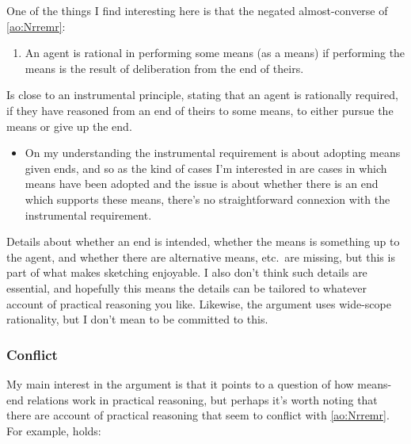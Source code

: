\documentclass[10pt]{article}
\newcommand{\hozlinedash}[0]{%
  \noindent\hdashrule[0.5ex][c]{\textwidth}{.1pt}{2.5pt}
}
\begin{document}
One of the things I find interesting here is that the negated almost-converse of \ref{ao:Nrremr}:
\begin{enumerate}[label=\(\overline{\arabic*}\)., ref=\(\overline{(\arabic*)}\)]
\item\label{ao:Nrremr} An agent is rational in performing some means (as a means) if performing the means is the result of deliberation from the end of theirs.
\end{enumerate}
Is close to an instrumental principle, stating that an agent is rationally required, if they have reasoned from an end of theirs to some means, to either pursue the means or give up the end.

\begin{itemize}
\item[] On my understanding the instrumental requirement is about adopting means given ends, and so as the kind of cases I'm interested in are cases in which means have been adopted and the issue is about whether there is an end which supports these means, there's no straightforward connexion with the instrumental requirement.
\end{itemize}


Details about whether an end is intended, whether the means is something up to the agent, and whether there are alternative means, etc.\ are missing, but this is part of what makes sketching enjoyable.
I also don't think such details are essential, and hopefully this means the details can be tailored to whatever account of practical reasoning you like.
Likewise, the argument uses wide-scope rationality, but I don't mean to be committed to this.


\hozlinedash

\subsubsection*{Conflict}
\label{sec:conflict}

My main interest in the argument is that it points to a question of how means-end relations work in practical reasoning, but perhaps it's worth noting that there are account of practical reasoning that seem to conflict with \ref{ao:Nrremr}.
For example, \citeauthor{Sinhababu:2017aa} holds:
\end{document}
